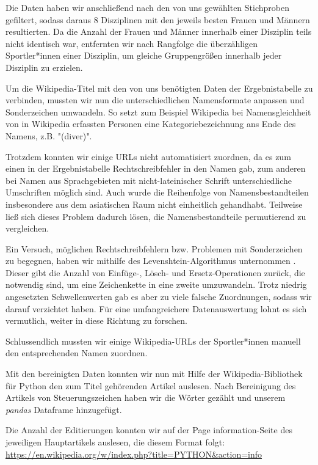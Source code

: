 \documentclass[11pt]{article}
\begin{document}
Die Daten haben wir anschließend nach den von uns gewählten Stichproben gefiltert, sodass daraus 8 Disziplinen mit den jeweils besten Frauen und Männern resultierten. Da die Anzahl der Frauen und Männer innerhalb einer Disziplin teils nicht identisch war, entfernten wir nach Rangfolge die überzähligen Sportler*innen einer Disziplin, um gleiche Gruppengrößen innerhalb jeder Disziplin zu erzielen.

Um die Wikipedia-Titel mit den von uns benötigten Daten der Ergebnistabelle zu verbinden, mussten wir nun die unterschiedlichen Namensformate anpassen und Sonderzeichen umwandeln. So setzt zum Beispiel Wikipedia bei Namensgleichheit von in Wikipedia erfassten Personen eine Kategoriebezeichnung ans Ende des Namens, z.B. "(diver)".

Trotzdem konnten wir einige URLs nicht automatisiert zuordnen, da es zum einen in der Ergebnistabelle Rechtschreibfehler in den Namen gab, zum anderen bei Namen aus Sprachgebieten mit nicht-lateinischer Schrift unterschiedliche Umschriften möglich sind. Auch wurde die Reihenfolge von Namensbestandteilen insbesondere aus dem asiatischen Raum nicht einheitlich gehandhabt. Teilweise ließ sich dieses Problem dadurch lösen, die Namensbestandteile permutierend zu vergleichen. 

Ein Versuch, möglichen Rechtschreibfehlern bzw. Problemen mit Sonderzeichen zu begegnen, haben wir mithilfe des Levenshtein-Algorithmus unternommen \parencite{Sulzberger2019}. Dieser gibt die Anzahl von Einfüge-, Lösch- und Ersetz-Operationen zurück, die notwendig sind, um eine Zeichenkette in eine zweite umzuwandeln. Trotz niedrig angesetzten Schwellenwerten gab es aber zu viele falsche Zuordnungen, sodass wir darauf verzichtet haben. Für eine umfangreichere Datenauswertung lohnt es sich vermutlich, weiter in diese Richtung zu forschen. 

Schlussendlich mussten wir einige Wikipedia-URLs der Sportler*innen manuell den entsprechenden Namen zuordnen. 

Mit den bereinigten Daten konnten wir nun mit Hilfe der Wikipedia-Bibliothek für Python \cite{goldsmith} den zum Titel gehörenden Artikel auslesen. Nach Bereinigung des Artikels von Steuerungszeichen haben wir die Wörter gezählt und unserem \textit{pandas} Dataframe hinzugefügt. 

Die Anzahl der Editierungen konnten wir auf der Page information-Seite des jeweiligen Hauptartikels auslesen, die diesem Format folgt:
\url{https://en.wikipedia.org/w/index.php?title=PYTHON&action=info}
\end{document}
